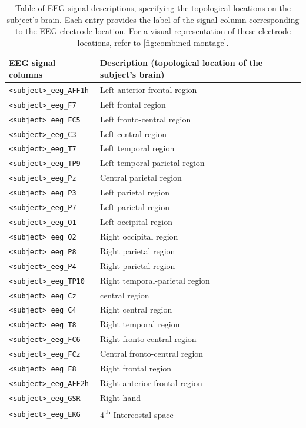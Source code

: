 \begin{table}
\centering
\begin{tabularx}{\textwidth}{|l|X|}
\hline
\textbf{EEG signal columns} & \textbf{Description (topological location of the subject's brain)} \\
\hline
\texttt{<subject>\_eeg\_AFF1h} & Left anterior frontal region \\
\hline
\texttt{<subject>\_eeg\_F7} & Left frontal region  \\
\hline
\texttt{<subject>\_eeg\_FC5} & Left fronto-central region  \\
\hline
\texttt{<subject>\_eeg\_C3} & Left central region \\
\hline
\texttt{<subject>\_eeg\_T7} & Left temporal region \\
\hline
\texttt{<subject>\_eeg\_TP9} & Left temporal-parietal region \\
\hline
\texttt{<subject>\_eeg\_Pz} & Central parietal region \\
\hline
\texttt{<subject>\_eeg\_P3} & Left parietal region \\
\hline
\texttt{<subject>\_eeg\_P7} & Left parietal region \\
\hline
\texttt{<subject>\_eeg\_O1} & Left occipital region \\
\hline
\texttt{<subject>\_eeg\_O2} & Right occipital region \\
\hline
\texttt{<subject>\_eeg\_P8} & Right parietal region \\
\hline
\texttt{<subject>\_eeg\_P4} & Right parietal region \\
\hline
\texttt{<subject>\_eeg\_TP10} & Right temporal-parietal region \\
\hline
\texttt{<subject>\_eeg\_Cz} & central region \\
\hline
\texttt{<subject>\_eeg\_C4} & Right central region \\
\hline
\texttt{<subject>\_eeg\_T8} & Right temporal region \\
\hline
\texttt{<subject>\_eeg\_FC6} & Right fronto-central region \\
\hline
\texttt{<subject>\_eeg\_FCz} & Central fronto-central region \\
\hline
\texttt{<subject>\_eeg\_F8} & Right frontal region \\
\hline
\texttt{<subject>\_eeg\_AFF2h} & Right anterior frontal region \\
\hline
\texttt{<subject>\_eeg\_GSR} & Right hand \\
\hline
\texttt{<subject>\_eeg\_EKG} & 4\textsuperscript{th} Intercostal space \\
\hline
\end{tabularx}
\caption{Table of EEG signal descriptions, specifying the topological locations on the subject's brain. Each entry provides the label of the signal column corresponding to the EEG electrode location. For a visual representation of these electrode locations, refer to \autoref{fig:combined-montage}.}
\label{tab:EEG_signals}
\end{table}

